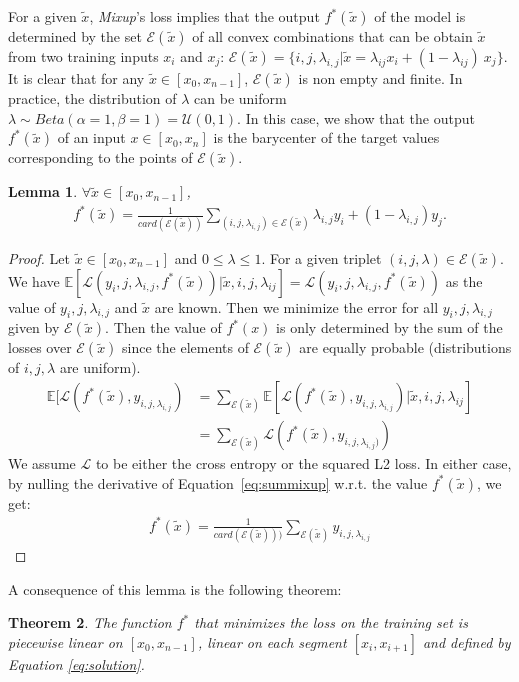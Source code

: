\documentclass[twoside]{article}
\newtheorem{theorem}{Theorem}[section]
\newtheorem{lemma}[theorem]{Lemma}
\numberwithin{intassumption}{assumption}
\begin{document}
For a given $\tilde x$, \emph{Mixup}'s loss implies that the output $f^*(\tilde x)$ of the model is determined by the set $\mathcal{E}(\tilde x)$ of all convex combinations that can be obtain $\tilde x$ from two training inputs $x_i$ and $x_j$: $\mathcal{E}(\tilde x)= \{ i,j,\lambda_{i,j} \vert \tilde x = \lambda_{ij} x_i+(1-\lambda_{ij})\ x_j\}$. 
 It is clear that for any $\tilde x \in [x_0,x_{n-1}]$, $\mathcal{E}(\tilde x)$ is non empty and finite. In practice, the distribution of $\lambda$ can be uniform  ~\citep{zhang2017mixup,manifold}  $\lambda \sim Beta(\alpha = 1, \beta = 1) = \mathcal{U}(0,1)$. In this case, we show that the output $f^*(\tilde x)$ of an input $x \in [x_0,x_n]$ is the barycenter of the target values corresponding to the points of $\mathcal{E}(\tilde x)$.
\begin{lemma}
   $\forall \tilde x \in [x_0,x_{n-1}]$,
    \begin{align}
    f^*(\tilde x) = \frac{1}{card(\mathcal{E}(\tilde x))} \sum_{(i,j,\lambda_{i,j}) \in {\mathcal{E}(\tilde x)}}\lambda_{i,j}y_i+(1-\lambda_{i,j})y_j.
    \label{eq:solution}
\end{align}
\end{lemma}
\begin{proof}
Let $ \tilde x \in [x_0,x_{n-1}]$ and $0\leq\lambda \leq 1$. For a given triplet $(i,j,\lambda) \in \mathcal{E}(\tilde x)$. We have $\mathbb{E}[\mathcal{L}(y_i,j,\lambda_{i,j},f^*(\tilde x)) \vert \tilde x, i,j,\lambda_{ij} ]= \mathcal{L}(y_i,j,\lambda_{i,j},f^*(\tilde x))$ as the value of $y_i,j,\lambda_{i,j}$ and $\tilde x$ are known. Then we minimize the error for all $y_i,j,\lambda_{i,j}$ given by $\mathcal{E}(\tilde x)$. Then the value of $f^*(x)$ is only determined by the sum of the losses over $\mathcal{E}(\tilde x)$
since the elements of $\mathcal{E}(\tilde x)$ are equally probable (distributions of $i,j,\lambda$ are uniform). 
\begin{align}
    \mathbb{E}[\mathcal{L}(f^*(\tilde x),y_{i,j,\lambda_{i,j}}) &= \sum_{\mathcal{E}(\tilde x)} \mathbb{E}[\mathcal{L}(f^*(\tilde x),y_{i,j,\lambda_{i,j}}) \vert \tilde x, i,j,\lambda_{ij}]  \nonumber\\
    &= \sum_{\mathcal{E}(\tilde x)}\mathcal{L}(f^*(\tilde x),y_{i,j,\lambda_{i,j})})
    \label{eq:summixup}
\end{align}
We assume $\mathcal{L}$ to be either the cross entropy or the squared L2 loss. In either case, by nulling the derivative of Equation~\eqref{eq:summixup} w.r.t. the value $f^*(\tilde{x})$, we get: 
\begin{align*}
    f^*(\tilde x) = \frac{1} {card(\mathcal{E}(\tilde x )))}\sum_{\mathcal{ E}(\tilde x)} y_{i,j,\lambda_{i,j}} 
\end{align*}
\end{proof}
A consequence of this lemma is the following theorem:
\begin{theorem}
     The function $f^*$ that minimizes the loss on the training set is piecewise linear on $[x_0,x_{n-1}]$, linear on each segment $[x_i,x_{i+1}]$ and defined by Equation \eqref{eq:solution}.
\end{theorem}
\end{document}

